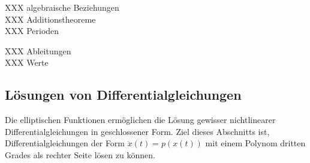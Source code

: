 XXX algebraische Beziehungen \\
XXX Additionstheoreme \\
XXX Perioden


XXX Ableitungen \\
XXX Werte \\

%
%
\subsection{Lösungen von Differentialgleichungen}
Die elliptischen Funktionen ermöglichen die Lösung gewisser nichtlinearer
Differentialgleichungen in geschlossener Form.
Ziel dieses Abschnitts ist, Differentialgleichungen der Form
\(
\ddot{x}(t)
=
p(x(t))
\)
mit einem Polynom dritten Grades als rechter Seite lösen zu können.

%
%
